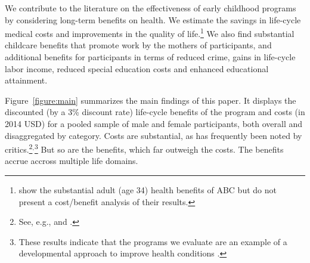 We contribute to the literature on the effectiveness of early childhood programs by considering long-term benefits on health. We estimate the savings in life-cycle medical costs and improvements in the quality of life.\footnote{\cite{Campbell_Conti_etal_2014_EarlyChildhoodInvestments} show the substantial adult (age 34) health benefits of ABC but do not present a cost/benefit analysis of their results.} We also find substantial childcare benefits that promote work by the mothers of participants, and additional benefits for participants in terms of reduced crime, gains in life-cycle labor income, reduced special education costs and enhanced educational attainment.

Figure~\ref{figure:main} summarizes the main findings of this paper. It displays the discounted (by a 3\% discount rate) life-cycle benefits of the program and costs (in 2014 USD) for a pooled sample of male and female participants, both overall and disaggregated by category. Costs are substantial, as has frequently been noted by critics.\footnote{See, e.g., \citet{Whitehurst_2014_Senate_Testimony} and \citet{Fox_News_2014_Head_Start_Effects}.}$^,$\footnote{These results indicate that the programs we evaluate are an example of a developmental approach to improve health conditions \citep{Conti-Heckman_2010_Socio-HO}.} But so are the benefits, which far outweigh the costs. The benefits accrue accross multiple life domains.

